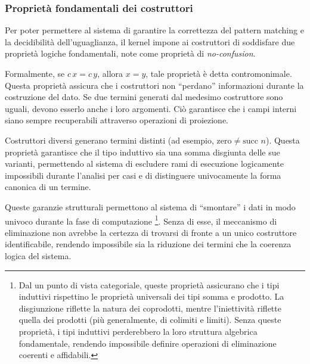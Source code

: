 \subsubsection{Proprietà fondamentali dei costruttori}
Per poter permettere al sistema di garantire la correttezza del pattern matching e la decidibilità dell'uguaglianza, il kernel impone ai costruttori di 
soddisfare due proprietà logiche fondamentali, note come proprietà di \emph{no-confusion}.
\begin{description}[leftmargin=1.5em, style=nextline, font=\bfseries]
    \item [Iniettività] 
        Formalmente, se $c \, x = c \, y$, allora $x = y$, tale proprietà è detta contromonimale. Questa proprietà assicura che i costruttori non ``perdano'' 
        informazioni durante la costruzione del dato. Se due termini generati dal medesimo costruttore sono uguali, devono esserlo anche i loro argomenti. Ciò 
        garantisce che i campi interni siano sempre recuperabili attraverso operazioni di proiezione.
    \item [Disgiunzione]
        Costruttori diversi generano termini distinti (ad esempio, $\text{zero} \neq \text{succ } n$). Questa proprietà garantisce che il tipo induttivo sia 
        una somma disgiunta delle sue varianti, permettendo al sistema di escludere rami di esecuzione logicamente impossibili durante l'analisi per casi e di 
        distinguere univocamente la forma canonica di un termine.
\end{description}
\newcommand{\notacategoriale}{
    Dal un punto di vista categoriale, queste proprietà assicurano che i tipi induttivi rispettino le proprietà universali dei tipi somma e prodotto. 
    La disgiunzione riflette la natura dei coprodotti, mentre l'iniettività riflette quella dei prodotti (più generalmente, di colimiti e limiti). Senza 
    queste proprietà, i tipi induttivi perderebbero la loro struttura algebrica fondamentale, rendendo impossibile definire operazioni di eliminazione 
    coerenti e affidabili.}
Queste garanzie strutturali permettono al sistema di ``smontare'' i dati in modo univoco durante la fase di computazione \footnote{\notacategoriale}. Senza di 
esse, il meccanismo di eliminazione non avrebbe la certezza di trovarsi di fronte a un unico costruttore identificabile, rendendo impossibile sia la riduzione 
dei termini che la coerenza logica del sistema.

